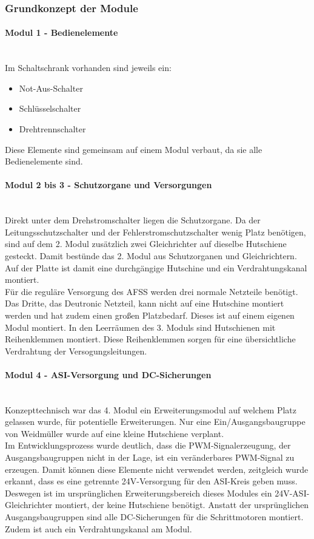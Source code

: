 \subsubsection{Grundkonzept der Module}
    \paragraph{Modul 1 - Bedienelemente}\mbox{}\\
    Im Schaltschrank vorhanden sind jeweils ein:
    \begin{itemize}
        \item Not-Aus-Schalter
        \item Schlüsselschalter
        \item Drehtrennschalter
    \end{itemize}
    Diese Elemente sind gemeinsam auf einem Modul verbaut, da sie alle Bedienelemente sind.
    \paragraph{Modul 2 bis 3 - Schutzorgane und Versorgungen}\mbox{}\\
    Direkt unter dem Drehstromschalter liegen die Schutzorgane. Da der Leitungsschutzschalter und der Fehlerstromschutzschalter wenig Platz benötigen, sind auf dem 2. Modul zusätzlich zwei Gleichrichter auf dieselbe Hutschiene gesteckt. Damit bestünde das 2. Modul aus Schutzorganen und Gleichrichtern. Auf der Platte ist damit eine durchgängige Hutschine und ein Verdrahtungskanal montiert.\\
    Für die reguläre Versorgung des AFSS werden drei normale Netzteile benötigt. Das Dritte, das Deutronic Netzteil, kann nicht auf eine Hutschine montiert werden und hat zudem einen großen Platzbedarf. Dieses ist auf einem eigenen Modul montiert. In den Leerräumen des 3. Moduls sind Hutschienen mit Reihenklemmen montiert. Diese Reihenklemmen sorgen für eine übersichtliche Verdrahtung der Versogungsleitungen.
    \paragraph{Modul 4 - ASI-Versorgung und DC-Sicherungen}\mbox{}\\
    Konzepttechnisch war das 4. Modul ein Erweiterungsmodul auf welchem Platz gelassen wurde, für potentielle Erweiterungen. Nur eine Ein/Ausgangsbaugruppe von Weidmüller wurde auf eine kleine Hutschiene verplant.\\
    Im Entwicklungsprozess wurde deutlich, dass die PWM-Signalerzeugung, der Ausgangsbaugruppen nicht in der Lage, ist ein veränderbares PWM-Signal zu erzeugen. Damit können diese Elemente nicht verwendet werden, zeitgleich wurde erkannt, dass es eine getrennte 24V-Versorgung für den ASI-Kreis geben muss. Deswegen ist im ursprünglichen Erweiterungsbereich dieses Modules ein 24V-ASI-Gleichrichter montiert, der keine Hutschiene benötigt. Anstatt der ursprünglichen Ausgangsbaugruppen sind alle DC-Sicherungen für die Schrittmotoren montiert. Zudem ist auch ein Verdrahtungskanal am Modul.
